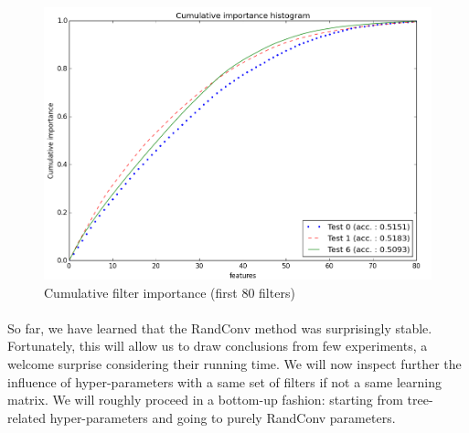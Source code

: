 \documentclass[a4paper]{report}
\begin{document}
		\begin{figure}
			\centering
				\includegraphics[width=1.0\textwidth]{images/FIGVarCumHist.png}
			\caption{\label{fig:FIGVarCumHist}Cumulative filter importance (first 80 filters)}
		\end{figure}
		
		\paragraph{}
		So far, we have learned that the RandConv method was surprisingly stable. Fortunately, this will allow us to draw conclusions from few experiments, a welcome surprise considering their running time. We will now inspect further the influence of hyper-parameters with a same set of filters if not a same learning matrix. We will roughly proceed in a bottom-up fashion: starting from tree-related hyper-parameters and going to purely RandConv parameters.
		
		
\end{document}
